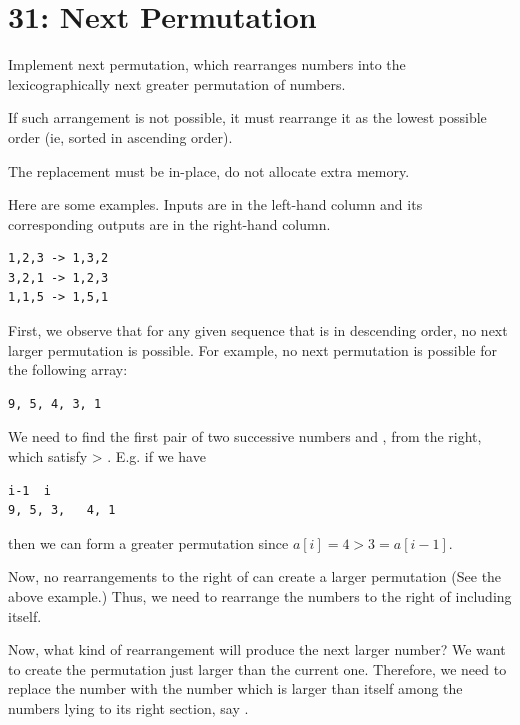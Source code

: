 \section{31: Next Permutation
  \label{secAlgoP31NextPermutation}}

Implement next permutation, which rearranges numbers into the
lexicographically next greater permutation of numbers.

If such arrangement is not possible, it must rearrange it as the lowest
possible order (ie, sorted in ascending order).

The replacement must be in-place, do not allocate extra memory.

Here are some examples. Inputs are in the left-hand column and its
corresponding outputs are in the right-hand column.
\begin{lstlisting}[style=raygeneric]
1,2,3 -> 1,3,2
3,2,1 -> 1,2,3
1,1,5 -> 1,5,1
\end{lstlisting}

\rrsepline{}


First, we observe that for any given sequence that is in descending order,
no next larger permutation is possible. For example, no next permutation is
possible for the following array: 
\begin{lstlisting}[style=raygeneric]
9, 5, 4, 3, 1
\end{lstlisting}
We need to find the first pair of two successive numbers  and
, from the right, which satisfy  > . 
E.g. if we have
\begin{lstlisting}[style=raygeneric]
      i-1  i
9, 5, 3,   4, 1
\end{lstlisting}
then we can form a greater permutation since $a[i]=4>3=a[i-1]$.

Now, no rearrangements to the right of  can create a larger
permutation  (See the above example.) Thus, we need to rearrange the numbers to
the right of  including itself.

Now, what kind of rearrangement will produce the next larger number? We want
to create the permutation just larger than the current one. Therefore, we
need to replace the number  with the number which is 
larger than itself among the numbers lying to its right section, say
.

